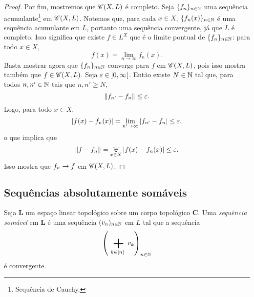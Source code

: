 \begin{proof}
Por fim, mostremos que $\mathscr{C}(X,L)$ é completo. Seja $\{f_n\}_{n \in \mathbb{N}}$ uma sequência acumulante\footnote{Sequência de Cauchy.} em $\mathscr{C}(X,L)$.
Notemos que, para cada $x \in X$, $\{f_n(x)\}_{n \in \mathbb{N}}$ é uma sequência acumulante em $L$, portanto uma sequência convergente, já que $L$ é completo. Isso significa que existe $f \in L^X$ que é o limite pontual de $\{f_n\}_{n \in \mathbb{N}}$: para todo $x \in X$,
	\begin{equation*}
	f(x) = \lim_{n \to \infty} f_n(x).
	\end{equation*}
Basta mostrar agora que $\{f_n\}_{n \in \mathbb{N}}$ converge para $f$ em $\mathscr{C}(X,L)$, pois isso mostra também que $f \in \mathscr{C}(X,L)$. Seja $\varepsilon \in \left]{0},{\infty}\right[$. Então existe $N \in \mathbb{N}$ tal que, para todos $n,n' \in \mathbb{N}$ tais que $n,n' \geq N$,
	\begin{equation*}
	\left\Vert{f_{n'} - f_n}\right\Vert \leq \varepsilon.
	\end{equation*}
Logo, para todo $x \in X$,
	\begin{equation*}
	\left\vert{f(x) - f_n(x)}\right\vert = \lim_{n' \to \infty} \left\vert{f_{n'} - f_n}\right\vert \leq \varepsilon,
	\end{equation*}
o que implica que
	\begin{equation*}
	\nor{f-f_n} = \max_{x \in X} \abs{f(x)-f_n(x)} \leq \varepsilon.
	\end{equation*}
Isso mostra que $f_n \rightarrow f$ em $\mathscr{C}(X,L)$.
\end{proof}





\subsection{Sequências absolutamente somáveis}

\begin{definition}
Seja $\bm L$ um espaço linear topológico sobre um corpo topológico $\bm C$. Uma \emph{sequência somável} em $\bm L$ é uma sequência $(v_n)_{n \in \mathbb{N}}$ em $L$ tal que a sequência
	\begin{equation*}
	\left( \sum_{k \in [n]} v_k \right)_{n \in \N}
	\end{equation*}
é convergente.
\end{definition}

